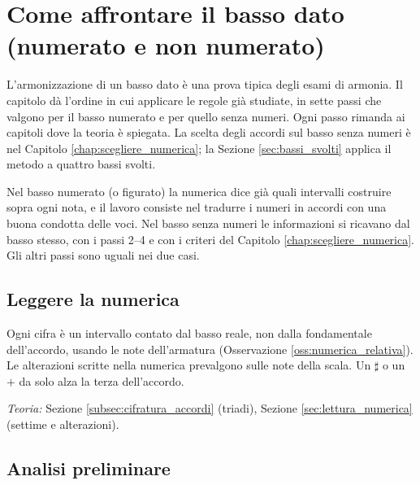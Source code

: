 \chapter{Come affrontare il basso dato (numerato e non numerato)}
\label{chap:metodo_lavoro}

L'armonizzazione di un basso dato è una prova tipica degli esami di armonia. Il capitolo dà l'ordine in cui applicare le regole già studiate, in sette passi che valgono per il basso numerato e per quello senza numeri. Ogni passo rimanda ai capitoli dove la teoria è spiegata. La scelta degli accordi sul basso senza numeri è nel Capitolo \ref{chap:scegliere_numerica}; la Sezione \ref{sec:bassi_svolti} applica il metodo a quattro bassi svolti.

Nel basso numerato (o figurato) la numerica dice già quali intervalli costruire sopra ogni nota, e il lavoro consiste nel tradurre i numeri in accordi con una buona condotta delle voci. Nel basso senza numeri le informazioni si ricavano dal basso stesso, con i passi 2--4 e con i criteri del Capitolo \ref{chap:scegliere_numerica}. Gli altri passi sono uguali nei due casi.

\section{Leggere la numerica}
\label{sec:lettura_numerica_metodo}

Ogni cifra è un intervallo contato dal basso reale, non dalla fondamentale dell'accordo, usando le note dell'armatura (Osservazione \ref{oss:numerica_relativa}). Le alterazioni scritte nella numerica prevalgono sulle note della scala. Un $\sharp$ o un $+$ da solo alza la terza dell'accordo.

\textit{Teoria:} Sezione \ref{subsec:cifratura_accordi} (triadi), Sezione \ref{sec:lettura_numerica} (settime e alterazioni).

\section{Analisi preliminare}
\label{sec:fase1_numerato}

